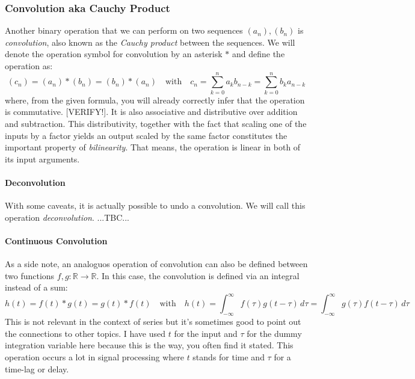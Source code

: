 \subsubsection{Convolution aka Cauchy Product}
Another binary operation that we can perform on two sequences $(a_n),(b_n)$ is \emph{convolution}, also known as the \emph{Cauchy product} between the sequences. We will denote the operation symbol for convolution by an asterisk $\ast$ and define the operation as:
\begin{equation}
 (c_n) = (a_n) \ast (b_n) = (b_n) \ast (a_n) \quad \text{with} \quad
 c_n = \sum_{k=0}^n a_k b_{n-k} = \sum_{k=0}^n b_k a_{n-k}
\end{equation}
where, from the given formula, you will already correctly infer that the operation is commutative.
[VERIFY!]. It is also associative and distributive over addition and subtraction. This distributivity, together with the fact that scaling one of the inputs by a factor yields an output scaled by the same factor constitutes the important property of \emph{bilinearity}. That means, the operation is linear in both of its input arguments.

\paragraph{Deconvolution}
With some caveats, it is actually possible to undo a convolution. We will call this operation \emph{deconvolution}. ...TBC...

\paragraph{Continuous Convolution}
As a side note, an analoguos operation of convolution can also be defined between two functions $f,g: \mathbb{R} \rightarrow \mathbb{R}$. In this case, the convolution is defined via an integral instead of a sum:
\begin{equation}
 h(t) = f(t) \ast g(t) = g(t) \ast f(t) \quad \text{with} \quad
 h(t) = \int_{-\infty}^{\infty} f(\tau) g(t-\tau) \, d \tau 
      = \int_{-\infty}^{\infty} g(\tau) f(t-\tau) \, d \tau
\end{equation}
This is not relevant in the context of series but it's sometimes good to point out the connections to other topics. I have used $t$ for the input and $\tau$ for the dummy integration variable here because this is the way, you often find it stated. This operation occurs a lot in signal processing where $t$ stands for time and $\tau$ for a time-lag or delay.




